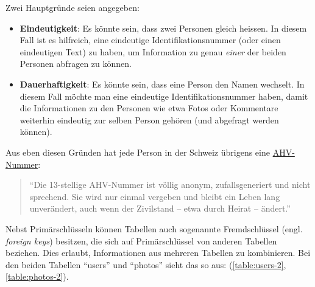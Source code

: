Zwei Hauptgründe seien angegeben:

\begin{itemize}
\item \textbf{Eindeutigkeit}: Es könnte sein, dass zwei Personen gleich heissen. In diesem Fall ist es hilfreich, eine eindeutige Identifikationsnummer (oder einen eindeutigen Text) zu haben, um Information zu genau \textit{einer} der beiden Personen abfragen zu können.
\item \textbf{Dauerhaftigkeit}: Es könnte sein, dass eine Person den Namen wechselt. In diesem Fall möchte man eine eindeutige Identifikationsnummer haben, damit die Informationen zu den Personen wie etwa Fotos oder Kommentare weiterhin eindeutig zur selben Person gehören (und abgefragt werden können).
\end{itemize}

Aus eben diesen Gründen hat jede Person in der Schweiz übrigens eine \href{https://www.bsv.admin.ch/bsv/de/home/sozialversicherungen/ahv/grundlagen-gesetze/ahv-nummer.html}{AHV-Nummer}: \begin{quote}
  \enquote{Die 13-stellige AHV-Nummer ist völlig anonym, zufallsgeneriert und nicht sprechend. Sie wird nur einmal vergeben und bleibt ein Leben lang unverändert, auch wenn der Zivilstand -- etwa durch Heirat -- ändert.}
\end{quote}


Nebst Primärschlüsseln können Tabellen auch sogenannte Fremdschlüssel (engl. \textit{foreign keys}) besitzen, die sich auf Primärschlüssel von anderen Tabellen beziehen. Dies erlaubt, Informationen aus mehreren Tabellen zu kombinieren. Bei den beiden Tabellen \enquote{users} und \enquote{photos} sieht das so aus: (\cref{table:users-2}, \cref{table:photos-2}).

